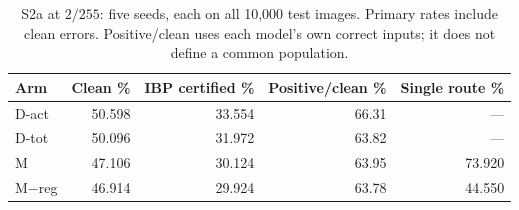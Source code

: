 \begin{table}[ht]
\centering\small
\begin{tabular}{lrrrr}
\toprule
Arm & Clean \% & IBP certified \% & Positive/clean \% & Single route \%\\
\midrule
D-act & 50.598 & 33.554 & 66.31 & ---\\
D-tot & 50.096 & 31.972 & 63.82 & ---\\
M & 47.106 & 30.124 & 63.95 & 73.920\\
M$-$reg & 46.914 & 29.924 & 63.78 & 44.550\\
\bottomrule
\end{tabular}
\caption{S2a at $2/255$: five seeds, each on all 10,000 test images. Primary rates include clean errors. Positive/clean uses each model's own correct inputs; it does not define a common population.}
\label{tab:s2primary}
\end{table}

